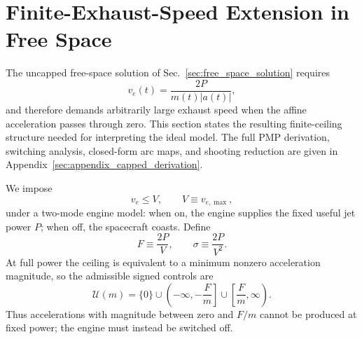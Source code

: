 \documentclass[journal,a4paper]{IEEEtran}
\begin{document}
\bigskip
\section{Finite-Exhaust-Speed Extension in Free Space}
\label{sec:capped_ve}
The uncapped free-space solution of Sec.~\ref{sec:free_space_solution} requires
\begin{equation}
    v_e(t)=\frac{2P}{m(t)|a(t)|},
\end{equation}
and therefore demands arbitrarily large exhaust speed when the affine acceleration passes through zero. This section states the resulting finite-ceiling structure needed for interpreting the ideal model. The full PMP derivation, switching analysis, closed-form arc maps, and shooting reduction are given in Appendix~\ref{sec:appendix_capped_derivation}.

We impose
\begin{equation}
    v_e\le V,\qquad V\equiv v_{e,\max},
\end{equation}
under a two-mode engine model: when on, the engine supplies the fixed useful jet power $P$; when off, the spacecraft coasts. Define
\begin{equation}
    F\equiv\frac{2P}{V},
    \qquad
    \sigma\equiv\frac{2P}{V^2}.
\end{equation}
At full power the ceiling is equivalent to a minimum nonzero acceleration magnitude, so the admissible signed controls are
\begin{equation}
    \mathcal U(m)
    =\{0\}\cup\left(-\infty,-\frac{F}{m}\right]
              \cup\left[\frac{F}{m},\infty\right).
    \label{eq:capped_summary_control_set}
\end{equation}
Thus accelerations with magnitude between zero and $F/m$ cannot be produced at fixed power; the engine must instead be switched off.
\end{document}
